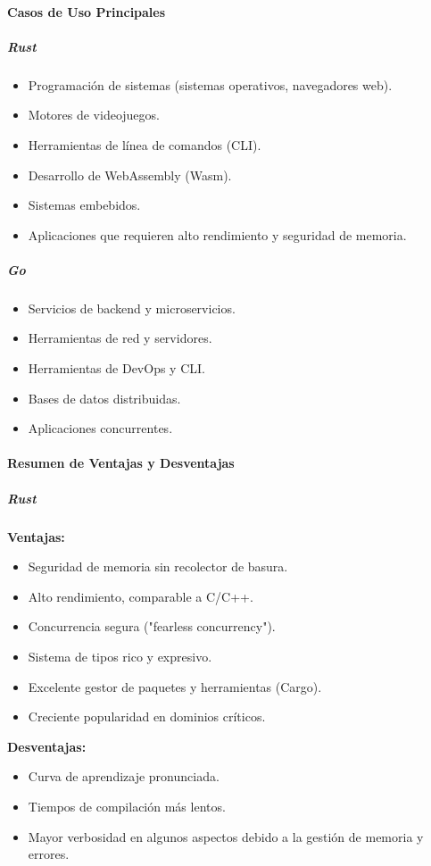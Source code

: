 \paragraph{Casos de Uso Principales}
\subparagraph{Rust}
\begin{itemize}
    \item Programación de sistemas (sistemas operativos, navegadores web).
    \item Motores de videojuegos.
    \item Herramientas de línea de comandos (CLI).
    \item Desarrollo de WebAssembly (Wasm).
    \item Sistemas embebidos.
    \item Aplicaciones que requieren alto rendimiento y seguridad de memoria.
\end{itemize}

\subparagraph{Go}
\begin{itemize}
    \item Servicios de backend y microservicios.
    \item Herramientas de red y servidores.
    \item Herramientas de DevOps y CLI.
    \item Bases de datos distribuidas.
    \item Aplicaciones concurrentes.
\end{itemize}

\paragraph{Resumen de Ventajas y Desventajas}

\subparagraph{Rust}
\textbf{Ventajas:}
\begin{itemize}
    \item Seguridad de memoria sin recolector de basura.
    \item Alto rendimiento, comparable a C/C++.
    \item Concurrencia segura ("fearless concurrency").
    \item Sistema de tipos rico y expresivo.
    \item Excelente gestor de paquetes y herramientas (Cargo).
    \item Creciente popularidad en dominios críticos.
\end{itemize}
\textbf{Desventajas:}
\begin{itemize}
    \item Curva de aprendizaje pronunciada.
    \item Tiempos de compilación más lentos.
    \item Mayor verbosidad en algunos aspectos debido a la gestión de memoria y errores.
\end{itemize}

